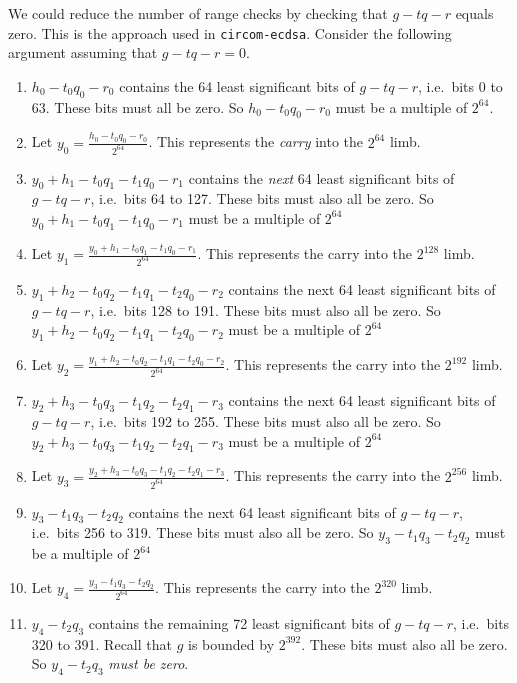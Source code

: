\documentclass[a4paper, 12pt]{article}
\begin{document}
We could reduce the number of range checks by checking that $g-tq-r$ equals zero. This is the approach used in \texttt{circom-ecdsa}. Consider the following argument assuming that $g-tq-r = 0$.
\begin{enumerate}
  \item $h_0-t_0q_0-r_0$ contains the 64 least significant bits of $g-tq-r$, i.e.~bits 0 to 63. These bits must all be zero. So $h_0-t_0q_0-r_0$ must be a multiple of $2^{64}$. 
  \item Let $y_0 = \frac{h_0-t_0q_0-r_0}{2^{64}}$. This represents the \textit{carry} into the $2^{64}$ limb.
  \item $y_0+h_1-t_0q_1-t_1q_0-r_1$ contains the \textit{next} 64 least significant bits of $g-tq-r$, i.e.~bits 64 to 127. These bits must also all be zero. So $y_0+h_1-t_0q_1-t_1q_0-r_1$ must be a multiple of $2^{64}$
  \item Let $y_1 = \frac{y_0+h_1-t_0q_1-t_1q_0-r_1}{2^{64}}$. This represents the carry into the $2^{128}$ limb.
  \item $y_1+h_2-t_0q_2-t_1q_1-t_2q_0-r_2$ contains the next 64 least significant bits of $g-tq-r$, i.e.~bits 128 to 191. These bits must also all be zero. So $y_1+h_2-t_0q_2-t_1q_1-t_2q_0-r_2$ must be a multiple of $2^{64}$
  \item Let $y_2 = \frac{y_1+h_2-t_0q_2-t_1q_1-t_2q_0-r_2}{2^{64}}$. This represents the carry into the $2^{192}$ limb.
  \item $y_2+h_3-t_0q_3-t_1q_2-t_2q_1-r_3$ contains the next 64 least significant bits of $g-tq-r$, i.e.~bits 192 to 255. These bits must also all be zero. So $y_2+h_3-t_0q_3-t_1q_2-t_2q_1-r_3$ must be a multiple of $2^{64}$
  \item Let $y_3 = \frac{y_2+h_3-t_0q_3-t_1q_2-t_2q_1-r_3}{2^{64}}$. This represents the carry into the $2^{256}$ limb.
  \item $y_3-t_1q_3-t_2q_2$ contains the next 64 least significant bits of $g-tq-r$, i.e.~bits 256 to 319. These bits must also all be zero. So $y_3-t_1q_3-t_2q_2$ must be a multiple of $2^{64}$
  \item Let $y_4 = \frac{y_3-t_1q_3-t_2q_2}{2^{64}}$. This represents the carry into the $2^{320}$ limb.
  \item $y_4-t_2q_3$ contains the remaining 72 least significant bits of $g-tq-r$, i.e.~bits 320 to 391. Recall that $g$ is bounded by $2^{392}$. These bits must also all be zero. So $y_4-t_2q_3$ \textit{must be zero}.
\end{enumerate}
\end{document}
